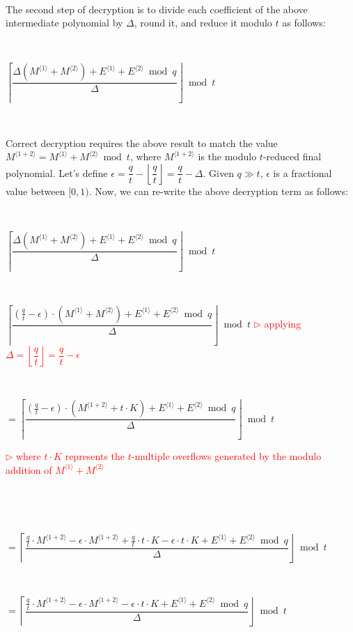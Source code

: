 $ $

The second step of decryption is to divide each coefficient of the above intermediate polynomial by $\Delta$, round it, and reduce it modulo $t$ as follows:

$ $

$\left\lceil\dfrac{\Delta (M^{\langle 1\rangle} + M^{\langle 2\rangle}) + E^{\langle 1 \rangle} + E^{\langle 2 \rangle} \bmod q}{\Delta}\right\rfloor \bmod t$

$ $

Correct decryption requires the above result to match the value $M^{\langle 1 + 2 \rangle} = M^{\langle 1 \rangle} + M^{\langle 2 \rangle} \bmod t$, where $M^{\langle 1 + 2 \rangle}$ is the modulo $t$-reduced final polynomial. Let's define $\epsilon = \dfrac{q}{t} - \left\lfloor\dfrac{q}{t}\right\rfloor = \dfrac{q}{t} - \Delta$. Given $q \gg t$, $\epsilon$ is a fractional value between $[0, 1)$. Now, we can re-write the above decryption term as follows:

$ $

$\left\lceil\dfrac{\Delta (M^{\langle 1\rangle} + M^{\langle 2\rangle}) + E^{\langle 1 \rangle} + E^{\langle 2 \rangle} \bmod q}{\Delta}\right\rfloor \bmod t$ 

$ $

$\left\lceil\dfrac{(\frac{q}{t} - \epsilon)\cdot (M^{\langle 1\rangle} + M^{\langle 2\rangle}) + E^{\langle 1 \rangle} + E^{\langle 2 \rangle} \bmod q}{\Delta}\right\rfloor \bmod t$ \textcolor{red}{ $\rhd$ applying $\Delta = \left\lfloor\dfrac{q}{t}\right\rfloor = \dfrac{q}{t} - \epsilon$}

$ $

$ = \left\lceil\dfrac{(\frac{q}{t} - \epsilon)\cdot (M^{\langle 1 + 2\rangle} + t\cdot K) + E^{\langle 1 \rangle} + E^{\langle 2 \rangle} \bmod q}{\Delta}\right\rfloor \bmod t$ 

\textcolor{red}{ $\rhd$ where $t \cdot K$ represents the $t$-multiple overflows generated by the modulo addition of $M^{\langle 1\rangle} + M^{\langle 2\rangle}$ }

$ $

$ $

$ = \left\lceil\dfrac{\frac{q}{t} \cdot M^{\langle 1 + 2\rangle}  - \epsilon \cdot M^{\langle 1 + 2\rangle}  + \frac{q}{t} \cdot t\cdot K  - \epsilon \cdot t\cdot K + E^{\langle 1 \rangle} + E^{\langle 2 \rangle} \bmod q}{\Delta}\right\rfloor \bmod t$ 

$ $

$ = \left\lceil\dfrac{\frac{q}{t} \cdot M^{\langle 1 + 2\rangle}  - \epsilon \cdot M^{\langle 1 + 2\rangle}  - \epsilon \cdot t\cdot K + E^{\langle 1 \rangle} + E^{\langle 2 \rangle} \bmod q}{\Delta}\right\rfloor \bmod t$ 

